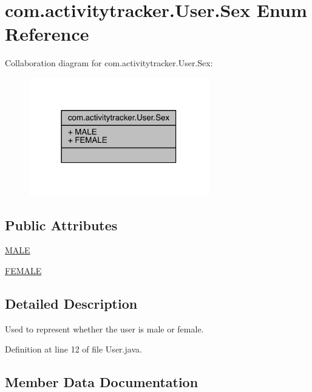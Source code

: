 \hypertarget{enumcom_1_1activitytracker_1_1_user_1_1_sex}{}\section{com.\+activitytracker.\+User.\+Sex Enum Reference}
\label{enumcom_1_1activitytracker_1_1_user_1_1_sex}


Collaboration diagram for com.\+activitytracker.\+User.\+Sex\+:
\nopagebreak
\begin{figure}[H]
\begin{center}
\leavevmode
\includegraphics[width=222pt]{enumcom_1_1activitytracker_1_1_user_1_1_sex__coll__graph}
\end{center}
\end{figure}
\subsection*{Public Attributes}
\begin{DoxyCompactItemize}
\item 
\mbox{\hyperlink{enumcom_1_1activitytracker_1_1_user_1_1_sex_ad3b626a38bd4615eb621d75b939f412d}{M\+A\+LE}}
\item 
\mbox{\hyperlink{enumcom_1_1activitytracker_1_1_user_1_1_sex_a5c22ece8a4df71ed5202cd492990a752}{F\+E\+M\+A\+LE}}
\end{DoxyCompactItemize}


\subsection{Detailed Description}
Used to represent whether the user is male or female. 

Definition at line 12 of file User.\+java.



\subsection{Member Data Documentation}
\mbox{\label{enumcom_1_1activitytracker_1_1_user_1_1_sex_a5c22ece8a4df71ed5202cd492990a752}} 
